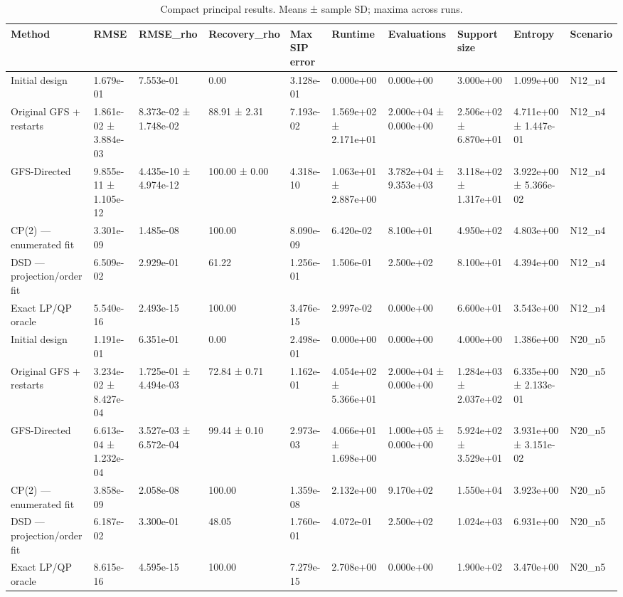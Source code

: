 \begin{table}
\caption{Compact principal results. Means ± sample SD; maxima across runs.}
\begin{tabular}{llllllllll}
\toprule
Method & RMSE & RMSE\_rho & Recovery\_rho & Max SIP error & Runtime & Evaluations & Support size & Entropy & Scenario \\
\midrule
Initial design & 1.679e-01 & 7.553e-01 & 0.00 & 3.128e-01 & 0.000e+00 & 0.000e+00 & 3.000e+00 & 1.099e+00 & N12\_n4 \\
Original GFS + restarts & 1.861e-02 ± 3.884e-03 & 8.373e-02 ± 1.748e-02 & 88.91 ± 2.31 & 7.193e-02 & 1.569e+02 ± 2.171e+01 & 2.000e+04 ± 0.000e+00 & 2.506e+02 ± 6.870e+01 & 4.711e+00 ± 1.447e-01 & N12\_n4 \\
GFS-Directed & 9.855e-11 ± 1.105e-12 & 4.435e-10 ± 4.974e-12 & 100.00 ± 0.00 & 4.318e-10 & 1.063e+01 ± 2.887e+00 & 3.782e+04 ± 9.353e+03 & 3.118e+02 ± 1.317e+01 & 3.922e+00 ± 5.366e-02 & N12\_n4 \\
CP(2) — enumerated fit & 3.301e-09 & 1.485e-08 & 100.00 & 8.090e-09 & 6.420e-02 & 8.100e+01 & 4.950e+02 & 4.803e+00 & N12\_n4 \\
DSD — projection/order fit & 6.509e-02 & 2.929e-01 & 61.22 & 1.256e-01 & 1.506e-01 & 2.500e+02 & 8.100e+01 & 4.394e+00 & N12\_n4 \\
Exact LP/QP oracle & 5.540e-16 & 2.493e-15 & 100.00 & 3.476e-15 & 2.997e-02 & 0.000e+00 & 6.600e+01 & 3.543e+00 & N12\_n4 \\
Initial design & 1.191e-01 & 6.351e-01 & 0.00 & 2.498e-01 & 0.000e+00 & 0.000e+00 & 4.000e+00 & 1.386e+00 & N20\_n5 \\
Original GFS + restarts & 3.234e-02 ± 8.427e-04 & 1.725e-01 ± 4.494e-03 & 72.84 ± 0.71 & 1.162e-01 & 4.054e+02 ± 5.366e+01 & 2.000e+04 ± 0.000e+00 & 1.284e+03 ± 2.037e+02 & 6.335e+00 ± 2.133e-01 & N20\_n5 \\
GFS-Directed & 6.613e-04 ± 1.232e-04 & 3.527e-03 ± 6.572e-04 & 99.44 ± 0.10 & 2.973e-03 & 4.066e+01 ± 1.698e+00 & 1.000e+05 ± 0.000e+00 & 5.924e+02 ± 3.529e+01 & 3.931e+00 ± 3.151e-02 & N20\_n5 \\
CP(2) — enumerated fit & 3.858e-09 & 2.058e-08 & 100.00 & 1.359e-08 & 2.132e+00 & 9.170e+02 & 1.550e+04 & 3.923e+00 & N20\_n5 \\
DSD — projection/order fit & 6.187e-02 & 3.300e-01 & 48.05 & 1.760e-01 & 4.072e-01 & 2.500e+02 & 1.024e+03 & 6.931e+00 & N20\_n5 \\
Exact LP/QP oracle & 8.615e-16 & 4.595e-15 & 100.00 & 7.279e-15 & 2.708e+00 & 0.000e+00 & 1.900e+02 & 3.470e+00 & N20\_n5 \\

\end{tabular}
\end{table}
